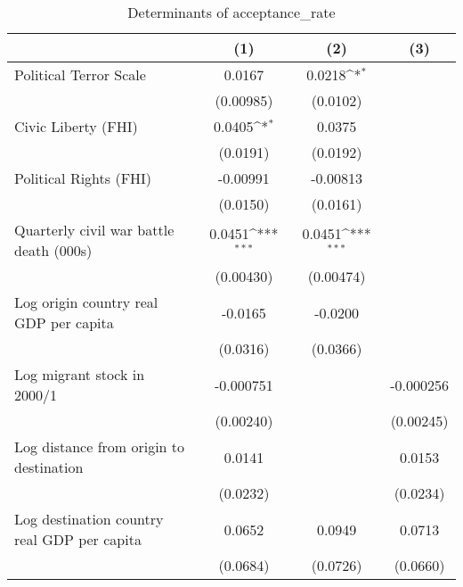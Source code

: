 \begin{table}[htbp]\centering
\def\sym#1{\ifmmode^{#1}\else\(^{#1}\)\fi}
\caption{Determinants of acceptance\_rate}
\begin{tabular}{l*{3}{c}}
\hline\hline
                    &\multicolumn{1}{c}{(1)}         &\multicolumn{1}{c}{(2)}         &\multicolumn{1}{c}{(3)}         \\
\hline
Political Terror Scale&      0.0167         &      0.0218\sym{*}  &                     \\
                    &   (0.00985)         &    (0.0102)         &                     \\
[1em]
Civic Liberty (FHI) &      0.0405\sym{*}  &      0.0375         &                     \\
                    &    (0.0191)         &    (0.0192)         &                     \\
[1em]
Political Rights (FHI)&    -0.00991         &    -0.00813         &                     \\
                    &    (0.0150)         &    (0.0161)         &                     \\
[1em]
Quarterly civil war battle death (000s)&      0.0451\sym{***}&      0.0451\sym{***}&                     \\
                    &   (0.00430)         &   (0.00474)         &                     \\
[1em]
Log origin country real GDP per capita&     -0.0165         &     -0.0200         &                     \\
                    &    (0.0316)         &    (0.0366)         &                     \\
[1em]
Log migrant stock in 2000/1&   -0.000751         &                     &   -0.000256         \\
                    &   (0.00240)         &                     &   (0.00245)         \\
[1em]
Log distance from origin to destination&      0.0141         &                     &      0.0153         \\
                    &    (0.0232)         &                     &    (0.0234)         \\
[1em]
Log destination country real GDP per capita&      0.0652         &      0.0949         &      0.0713         \\
                    &    (0.0684)         &    (0.0726)         &    (0.0660)         \\

\end{tabular}
\end{table}

